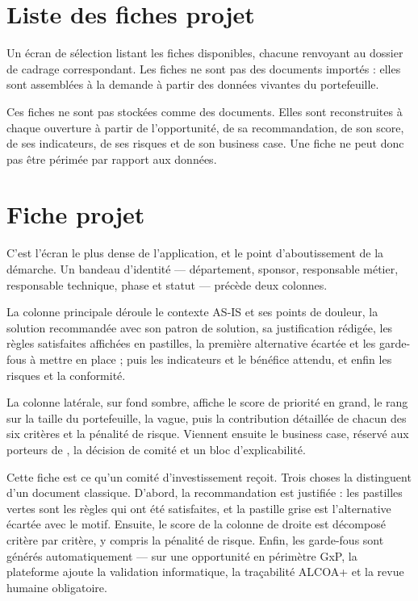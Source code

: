 \section{Liste des fiches projet}

Un écran de sélection listant les fiches disponibles, chacune renvoyant au dossier de
cadrage correspondant. Les fiches ne sont pas des documents importés : elles sont
assemblées à la demande à partir des données vivantes du portefeuille.


\begin{oral}
Ces fiches ne sont pas stockées comme des documents. Elles sont reconstruites à chaque
ouverture à partir de l'opportunité, de sa recommandation, de son score, de ses
indicateurs, de ses risques et de son business case. Une fiche ne peut donc pas être
périmée par rapport aux données.
\end{oral}

\section{Fiche projet}

C'est l'écran le plus dense de l'application, et le point d'aboutissement de la
démarche. Un bandeau d'identité — département, sponsor, responsable métier, responsable
technique, phase et statut — précède deux colonnes.

La colonne principale déroule le contexte AS-IS et ses points de douleur, la solution
recommandée avec son patron de solution, sa justification rédigée, les règles satisfaites
affichées en pastilles, la première alternative écartée et les garde-fous à mettre en
place ; puis les indicateurs et le bénéfice attendu, et enfin les risques et la
conformité.

La colonne latérale, sur fond sombre, affiche le score de priorité en grand, le rang sur
la taille du portefeuille, la vague, puis la contribution détaillée de chacun des six
critères et la pénalité de risque. Viennent ensuite le business case, réservé aux
porteurs de , la décision de comité et un bloc d'explicabilité.


\begin{oral}
Cette fiche est ce qu'un comité d'investissement reçoit. Trois choses la distinguent
d'un document classique. D'abord, la recommandation est justifiée : les pastilles vertes
sont les règles qui ont été satisfaites, et la pastille grise est l'alternative écartée
avec le motif. Ensuite, le score de la colonne de droite est décomposé critère par
critère, y compris la pénalité de risque. Enfin, les garde-fous sont générés
automatiquement — sur une opportunité en périmètre GxP, la plateforme ajoute la
validation informatique, la traçabilité ALCOA+ et la revue humaine obligatoire.
\end{oral}

